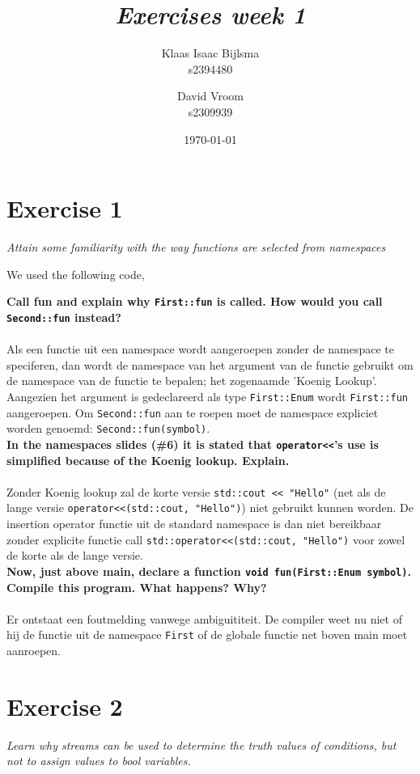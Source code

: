 \documentclass[12pt]{article}
\title{\itshape Exercises week 1}
\author{
	Klaas Isaac Bijlsma \\ s2394480
	\and
	David Vroom \\ s2309939
}
\date{\today}
\newcommand{\desc}[1]{\textit{#1} \vspace{1em}}
\begin{document}
\maketitle

\section*{Exercise 1}
\desc{Attain some familiarity with the way functions are selected from namespaces}

We used the following code,


\textbf{Call fun and explain why \texttt{First::fun} is called. How would you call \texttt{Second::fun} instead?}\\
\\
Als een functie uit een namespace wordt aangeroepen zonder de namespace te speciferen, dan wordt de namespace van het argument van de functie gebruikt om de namespace van de functie te bepalen; het zogenaamde 'Koenig Lookup'. Aangezien het argument is gedeclareerd als type \texttt{First::Enum} wordt \texttt{First::fun} aangeroepen. Om \texttt{Second::fun} aan te roepen moet de namespace expliciet worden genoemd: \texttt{Second::fun(symbol)}.\\

\textbf{In the namespaces slides (\#6) it is stated that \texttt{operator<<}'s use is simplified because of the Koenig lookup. Explain.}\\
\\
Zonder Koenig lookup zal de korte versie \texttt{std::cout << "Hello"} (net als de lange versie \texttt{operator<<(std::cout, "Hello")}) niet gebruikt kunnen worden. De insertion operator functie uit de standard namespace is dan niet bereikbaar zonder explicite functie call \texttt{std::operator<<(std::cout, "Hello")} voor zowel de korte als de lange versie.\\

\textbf{Now, just above main, declare a function \texttt{void fun(First::Enum symbol)}. Compile this program. What happens? Why?}\\
\\
Er ontstaat een foutmelding vanwege ambiguititeit. De compiler weet nu niet of hij de functie uit de namespace \texttt{First} of de globale functie net boven main moet aanroepen.


\clearpage
\section*{Exercise 2}
\desc{Learn why streams can be used to determine the truth values of conditions, but not to assign values to bool variables.}
\end{document}
